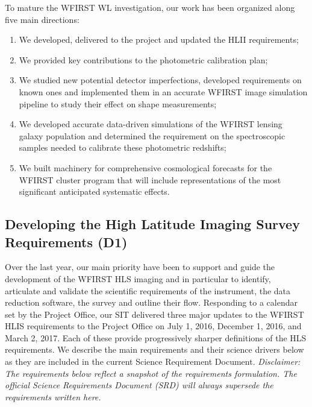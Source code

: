 \begin{summary}
To mature the WFIRST WL investigation, our work has been organized along five main
directions:
\begin{enumerate}
  \item We developed, delivered to the project and
updated the HLII requirements;
\item We provided key contributions to the
photometric calibration plan;
\item We studied new potential detector imperfections,
developed requirements on known ones and implemented them in an accurate
WFIRST image simulation pipeline to study their effect on shape measurements;
\item We developed accurate data-driven simulations of the WFIRST lensing galaxy population and determined the
requirement on the spectroscopic samples needed to calibrate these photometric redshifts;
\item We built machinery for comprehensive cosmological forecasts for the WFIRST cluster program that
will include representations of the most significant anticipated systematic effects.
\end{enumerate}
\end{summary}

 \subsection{Developing the High Latitude Imaging Survey Requirements (D1)}

 \begin{summaryii}
   Over the last year, our main priority have been to support and guide the
   development of the WFIRST HLS imaging and in particular to identify,
   articulate and validate the scientific requirements of the instrument, the
   data reduction software, the survey and outline their flow. Responding to a calendar set by the
   Project Office, our SIT delivered three major updates to the WFIRST HLIS
   requirements to the Project Office on July 1, 2016, December 1, 2016, and
   March 2, 2017. Each of these provide progressively sharper definitions of the
   HLS requirements. We describe the main requirements and their science drivers
   below as they are included in the current Science Requirement Document.
   \emph{Disclaimer: The requirements below reflect a snapshot of the requirements formulation. The official Science Requirements Document (SRD) will always supersede the requirements written here.}
 \end{summaryii}


